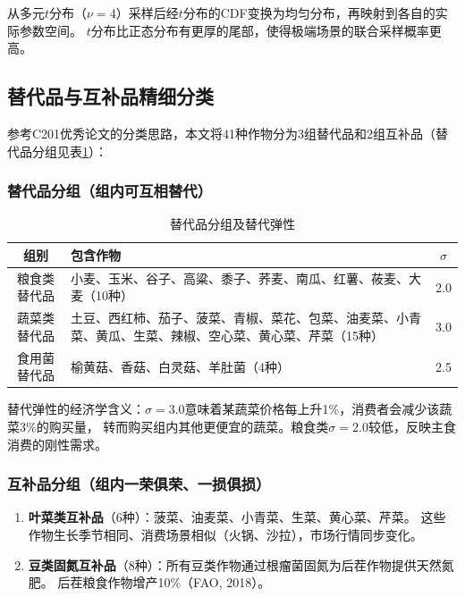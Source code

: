 \documentclass[12pt]{ctexart}
\begin{document}
从多元$t$分布（$\nu=4$）采样后经$t$分布的CDF变换为均匀分布，再映射到各自的实际参数空间。
$t$分布比正态分布有更厚的尾部，使得极端场景的联合采样概率更高。

\subsection{替代品与互补品精细分类}

参考C201优秀论文的分类思路，本文将41种作物分为3组替代品和2组互补品（替代品分组见表\ref{tab:substitution_groups}）：

\subsubsection{替代品分组（组内可互相替代）}

\begin{table}[H]
\centering
\caption{替代品分组及替代弹性}
\label{tab:substitution_groups}
\begin{tabular}{@{}cp{9.5cm}c@{}}
\toprule
\textbf{组别} & \textbf{包含作物} & \textbf{$\sigma$} \\
\midrule
粮食类替代品 & 小麦、玉米、谷子、高粱、黍子、荞麦、南瓜、红薯、莜麦、大麦（10种） & 2.0 \\
蔬菜类替代品 & 土豆、西红柿、茄子、菠菜、青椒、菜花、包菜、油麦菜、小青菜、黄瓜、生菜、辣椒、空心菜、黄心菜、芹菜（15种） & 3.0 \\
食用菌替代品 & 榆黄菇、香菇、白灵菇、羊肚菌（4种） & 2.5 \\
\bottomrule
\end{tabular}
\end{table}

替代弹性的经济学含义：$\sigma=3.0$意味着某蔬菜价格每上升1\%，消费者会减少该蔬菜3\%的购买量，
转而购买组内其他更便宜的蔬菜。粮食类$\sigma=2.0$较低，反映主食消费的刚性需求。

\subsubsection{互补品分组（组内一荣俱荣、一损俱损）}

\begin{enumerate}[label=(\arabic*), leftmargin=*]
    \item \textbf{叶菜类互补品}（6种）：菠菜、油麦菜、小青菜、生菜、黄心菜、芹菜。
          这些作物生长季节相同、消费场景相似（火锅、沙拉），市场行情同步变化。
    \item \textbf{豆类固氮互补品}（8种）：所有豆类作物通过根瘤菌固氮为后茬作物提供天然氮肥。
          后茬粮食作物增产10\%（FAO, 2018）。
\end{enumerate}
\end{document}
